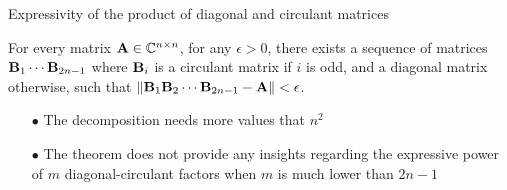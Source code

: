 \begin{frame}{Expressivity of the product of diagonal and circulant matrices}

 
  \begin{theorem} 
    For every matrix $\mathbf{A} \in {\ensuremath \mathbb{C}}^{n \times n}$, for any $\epsilon > 0$, there exists a sequence of matrices $\mathbf{B}_1 \cdots \mathbf{B}_{2n-1}$ where $\mathbf{B}_i$ is a circulant matrix if $i$ is odd, and a diagonal matrix otherwise, such that $\norm{\mathbf{B}_1 \mathbf{B}_2 \cdots \mathbf{B}_{2n-1} - \mathbf{A}} < \epsilon$.
  \end{theorem}

  \vspace{0.5cm}

  \begin{itemize}
    \item[$\bullet$] The decomposition needs more values that $n^2$
    \item[$\bullet$] The theorem does not provide any insights regarding the expressive power of $m$ diagonal-circulant factors when $m$ is much lower than $2n - 1$
  \end{itemize}



\end{frame}


